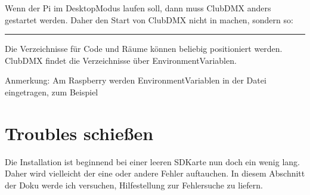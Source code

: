 \documentclass[letterpaper,10pt,ngerman]{sphinxmanual}
\begin{document}

Wenn der Pi im Desktop\sphinxhyphen{}Modus laufen soll, dann muss ClubDMX anders gestartet
werden. Daher den Start von ClubDMX nicht in  machen, sondern so:

\begin{sphinxVerbatim}[commandchars=\\\{\}]
  
 
\end{sphinxVerbatim}


\bigskip\hrule\bigskip



Die Verzeichnisse für Code und Räume können beliebig positioniert werden.
ClubDMX findet die Verzeichnisse über Environment\sphinxhyphen{}Variablen.

\begin{sphinxVerbatim}[commandchars=\\\{\}]
\end{sphinxVerbatim}

Anmerkung: Am Raspberry werden Environment\sphinxhyphen{}Variablen in der Datei
  eingetragen, zum Beispiel



\section{Troubles schießen}
\label{\detokenize{raspberry:troubles-schieszen}}
Die Installation ist \sphinxhyphen{} beginnend bei einer leeren SD\sphinxhyphen{}Karte \sphinxhyphen{} nun doch ein
wenig lang. Daher wird vielleicht der eine oder andere Fehler auftauchen.
In diesem Abschnitt der Doku werde ich versuchen, Hilfestellung zur
Fehlersuche zu liefern.
\end{document}
